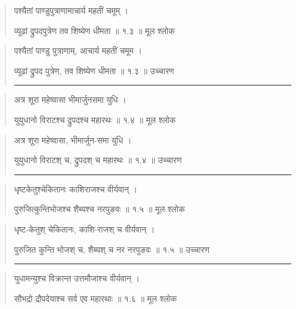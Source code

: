 \begin{quotation} 

पश्यैतां पाण्डुपुत्राणामाचार्य महतीं चमूम्‌  । 

व्यूढां द्रुपदपुत्रेण तव शिष्येण धीमता  ॥ १.३ ॥  मूल श्लोक
\end{quotation}

\begin{quotation} 

पश्यैतां पाण्डु पुत्राणाम्, आचार्य महतीं चमूम  ।  

व्यूढां द्रुपद पुत्रेण, तव शिष्येण धीमता  ॥ १.३ ॥  उच्चारण

\noindent\rule{16cm}{0.4pt} 
\end{quotation}


\begin{quotation} 

अत्र शूरा महेष्वासा भीमार्जुनसमा युधि  ।  

युयुधानो विराटश्च द्रुपदश्च महारथः  ॥ १.४ ॥  मूल श्लोक
\end{quotation}

\begin{quotation}

अत्र शूरा महेष्वासा, भीमार्जुन-समा युधि  ।  

युयुधानो विराटश् च, द्रुपदश् च महारथः  ॥ १.४ ॥  उच्चारण

\noindent\rule{16cm}{0.4pt} 
\end{quotation}


\begin{quotation} 


धृष्टकेतुश्चेकितानः काशिराजश्च वीर्यवान्‌  ।  

पुरुजित्कुन्तिभोजश्च शैब्यश्च नरपुङवः  ॥ १.५ ॥  मूल श्लोक
\end{quotation}

\begin{quotation}

धृष्ट-केतुश् चेकितानः, काशि-राजश् च वीर्यवान्  ।  

पुरुजित कुन्ति भोजश् च, शैब्यश्  च नर नरपुङवः  ॥ १.५ ॥  उच्चारण

\noindent\rule{16cm}{0.4pt} 
\end{quotation}


\begin{quotation} 

युधामन्युश्च विक्रान्त उत्तमौजाश्च वीर्यवान्‌  ।  

सौभद्रो द्रौपदेयाश्च सर्व एव महारथाः  ॥ १.६ ॥  मूल श्लोक
\end{quotation}

